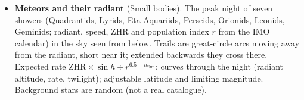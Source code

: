 \begin{itemize}
$a=(r_1+r_2)/2$. To meet the target, you must leave when it leads by $\varphi=\pi-n_2t$ (phase angle): the window comes
back every synodic period. Low orbit to the station, geostationary orbit or the Moon; Earth to Mars (2.94 then
2.65~km\,s$^{-1}$, 259~days, $\varphi=44.3^\circ$, a window every 780~days), Venus (both burns brake) or Jupiter. “Leave at
the launch window” or “Leave now”; the dotted circle shows where the target will be at arrival if you leave now.
\item \textbf{Meteors and their radiant} (Small bodies). The peak night of seven showers (Quadrantids, Lyrids, Eta
Aquariids, Perseids, Orionids, Leonids, Geminids; radiant, speed, ZHR and population index $r$ from the IMO calendar)
in the sky seen from below. Trails are great-circle arcs moving away from the radiant, short near it; extended
backwards they cross there. Expected rate $\mathrm{ZHR}\times\sin h\div r^{6.5-m_\text{lim}}$; curves through the
night (radiant altitude, rate, twilight); adjustable latitude and limiting magnitude. Background stars are random (not
a real catalogue).
\end{itemize}

